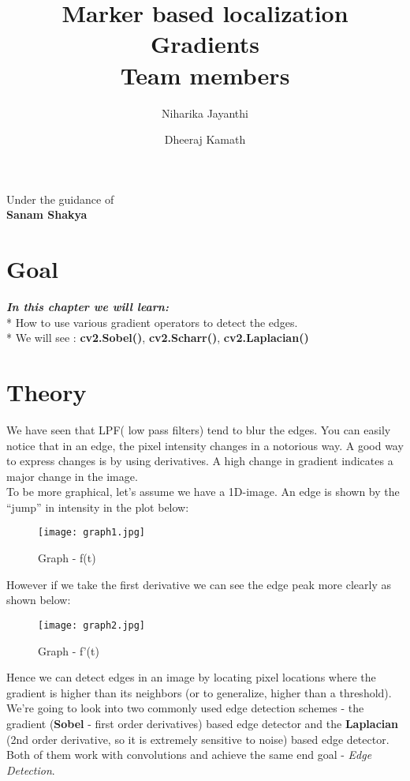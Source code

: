 \documentclass[]{article}
\date{}
\title {Marker based localization \\ [10pt]
	Gradients  \\[25pt] Team members }
\author {Niharika Jayanthi \and Dheeraj Kamath}
\begin{document}
\maketitle
\begin{center}
	\begin{large}
		Under the guidance of\\
		\textbf{Sanam Shakya}\\
		\vspace{0.5in}
	\end{large}
\end{center}

\section{Goal}\label{goal}

\emph{\textbf{In this chapter we will learn:}} \\
* How to use various
gradient operators to detect the edges. \\
* We will see :
\textbf{cv2.Sobel()}, \textbf{cv2.Scharr()}, \textbf{cv2.Laplacian()}

\section{Theory}\label{theory}

We have seen that LPF( low pass filters) tend to blur the edges. You can
easily notice that in an edge, the pixel intensity changes in a
notorious way. A good way to express changes is by using derivatives. A
high change in gradient indicates a major change in the image.\\
To be more graphical, let's assume we have a 1D-image. An edge is shown
by the ``jump'' in intensity in the plot below:\\
\begin{figure}
\texttt{[image: graph1.jpg]}
\caption{Graph - f(t)}
\end{figure}

However if we take the first derivative we can see the edge peak more
clearly as shown below:\\
\begin{figure}
	\texttt{[image: graph2.jpg]}
	\caption{Graph - f'(t)}
\end{figure}

Hence we can detect edges in an image by locating pixel locations where
the gradient is higher than its neighbors (or to generalize, higher than
a threshold).\\
We're going to look into two commonly used edge detection schemes - the
gradient (\textbf{Sobel} - first order derivatives) based edge detector
and the \textbf{Laplacian} (2nd order derivative, so it is extremely
sensitive to noise) based edge detector. Both of them work with
convolutions and achieve the same end goal - \emph{Edge Detection}.
\end{document}
